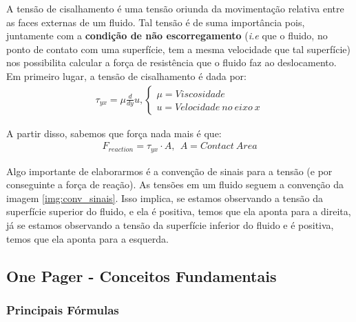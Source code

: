 \documentclass{article}
\begin{document}
A tensão de cisalhamento é uma tensão oriunda da movimentação relativa entre as faces externas de um fluido. Tal tensão é de suma importância pois, juntamente com a \textbf{condição de não
    escorregamento} (\emph{i.e} que o fluido, no ponto de contato com uma superfície, tem a mesma velocidade que tal superfície) nos possibilita calcular a força de resistência que o fluido
faz ao deslocamento.
Em primeiro lugar, a tensão de cisalhamento é dada por:
\begin{align}
    \tau_{yx} = \mu \frac{d}{dy} u, \begin{cases}
                                        \mu = Viscosidade \\
                                        u = Velocidade \ no \ eixo \ x
                                    \end{cases}
\end{align}

A partir disso, sabemos que força nada mais é que:
\begin{align}
    F_{reaction} = \tau_{yx} \cdot A, \ \ A= Contact \ Area
\end{align}


Algo importante de elaborarmos é a convenção de sinais para a tensão (e por conseguinte a força de reação). As tensões em um fluido seguem a convenção da imagem \ref{img:conv_sinais}. Isso
implica, se estamos observando a tensão da superfície superior do fluido, e ela é positiva, temos que ela aponta para a direita, já se estamos observando a tensão da superfície inferior
do fluido  e é positiva, temos que ela aponta para a esquerda.

\newpage
\subsection{One Pager - Conceitos Fundamentais}

\subsubsection*{Principais Fórmulas}
\end{document}

